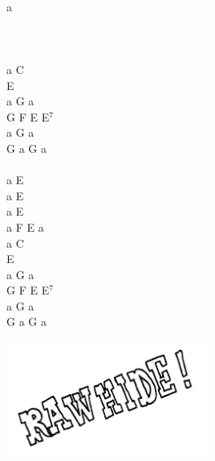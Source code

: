 \documentclass[a5paper, 10pt]{book}
\begin{document}
\begin{minipage}[t]{0.2\textwidth}
  ~\\
  a\\
  \\
  \\
  \\
  a C\\
  E\\
  a G a\\
  G F E E$^7$\\
  a G a\\
  G a G a\\
  \\
  a E \\
  a E \\
  a E\\
  a F E a\\

  a C\\
  E\\
  a G a\\
  G F E E$^7$\\
  a G a\\
  G a G a\\
\end{minipage}
\includegraphics[width=0.5\textwidth,angle=-30, center]{images/rawhide.png}\\

\newpage
\end{document}
